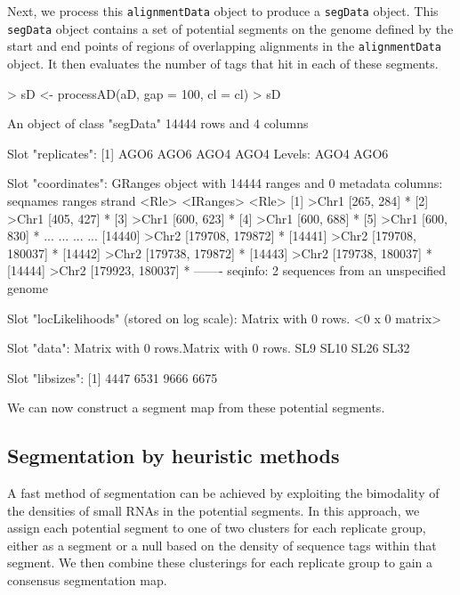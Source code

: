 \documentclass[a4paper]{article}
\begin{document}
Next, we process this \verb'alignmentData' object to produce a \verb'segData' object. This \verb'segData' object contains a set of potential segments on the genome defined by the start and end points of regions of overlapping alignments in the \verb'alignmentData' object. It then evaluates the number of tags that hit in each of these segments.

\begin{Schunk}
\begin{Sinput}
> sD <- processAD(aD, gap = 100, cl = cl)
> sD
\end{Sinput}
\begin{Soutput}
An object of class "segData"
14444 rows and 4 columns

Slot "replicates":
[1] AGO6 AGO6 AGO4 AGO4
Levels: AGO4 AGO6

Slot "coordinates":
GRanges object with 14444 ranges and 0 metadata columns:
          seqnames           ranges strand
             <Rle>        <IRanges>  <Rle>
      [1]    >Chr1       [265, 284]      *
      [2]    >Chr1       [405, 427]      *
      [3]    >Chr1       [600, 623]      *
      [4]    >Chr1       [600, 688]      *
      [5]    >Chr1       [600, 830]      *
      ...      ...              ...    ...
  [14440]    >Chr2 [179708, 179872]      *
  [14441]    >Chr2 [179708, 180037]      *
  [14442]    >Chr2 [179738, 179872]      *
  [14443]    >Chr2 [179738, 180037]      *
  [14444]    >Chr2 [179923, 180037]      *
  -------
  seqinfo: 2 sequences from an unspecified genome

Slot "locLikelihoods" (stored on log scale):
Matrix with  0  rows.
<0 x 0 matrix>

Slot "data":
Matrix with  0  rows.Matrix with  0  rows.
     SL9 SL10 SL26 SL32

Slot "libsizes":
[1] 4447 6531 9666 6675
\end{Soutput}
\end{Schunk}

We can now construct a segment map from these potential segments.

\subsection*{Segmentation by heuristic methods}

A fast method of segmentation can be achieved by exploiting the bimodality of the densities of small RNAs in the potential segments. In this approach, we assign each potential segment to one of two clusters for each replicate group, either as a segment or a null based on the density of sequence tags within that segment. We then combine these clusterings for each replicate group to gain a consensus segmentation map.
\end{document}
